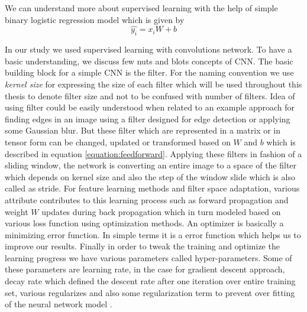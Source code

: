 We can understand more about supervised learning with the help of simple binary logistic regression model which is given by
\begin{equation} \label{equation:feedforward}
    \hat{y_{i}} = x_{i}W + b 
\end{equation}

In our study we used supervised learning with convolutions network. To have a basic understanding, we discuss few nuts and blots concepts of CNN. The basic building block for a simple CNN is the filter. For the naming convention we use \textit{kernel size} for expressing the size of each filter which will be used throughout this thesis to denote filter size and not to be confused with number of filters. Idea of using filter could be easily understood when related to an example approach for finding edges in an image using a filter designed for edge detection or applying some Gaussian blur. But these filter which are represented in a matrix or in tensor form can be changed, updated or transformed based on \(W\) and \(b\) which is described in equation \ref{equation:feedforward}. Applying these filters in fashion of a sliding window, the network is converting an entire image to a space of the filter which depends on kernel size and also the step of the window slide which is also called as stride. For feature learning methods and filter space adaptation, various attribute contributes to this learning process such as forward propagation and weight \(W\) updates during back propagation which in turn modeled based on various loss function using optimization methods. An optimizer is basically a minimizing error function. In simple terms it is a error function which helps us to improve our results. Finally in order to tweak the training and optimize the learning progress we have various parameters called hyper-parameters. Some of these parameters are learning rate, in the case for gradient descent approach, decay rate which defined the descent rate after one iteration over entire training set, various regularizes and also some regularization term to prevent over fitting of the neural network model \cite{friedman2001elements}. 




